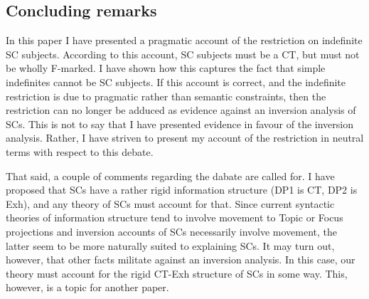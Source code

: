 \documentclass[
]{RCL}
\begin{document}
%
\subsection{Concluding remarks}
In this paper I have presented a pragmatic account of the restriction on indefinite SC subjects.
According to this account, SC subjects must be a CT, but must not be wholly F-marked.
I have shown how this captures the fact that simple indefinites cannot be SC subjects.
If this account is correct, and the indefinite restriction is due to pragmatic rather than semantic constraints, then the restriction can no longer be adduced as evidence against an inversion analysis of SCs. 
This is not to say that I have presented evidence in favour of the inversion analysis.
Rather, I have striven to present my account of the restriction in neutral terms with respect to this debate.

That said, a couple of comments regarding the dabate are called for.
I have proposed that SCs have a rather rigid information structure (DP1 is CT, DP2 is Exh), and any theory of SCs must account for that.
Since current syntactic theories of information structure tend to involve movement to Topic or Focus projections and inversion accounts of SCs necessarily involve movement, the latter seem to be more naturally suited to explaining SCs.
It may turn out, however, that other facts militate against an inversion analysis.
In this case, our theory must account for the rigid CT-Exh structure of SCs in some way.
This, however, is a topic for another paper.
\end{document}
